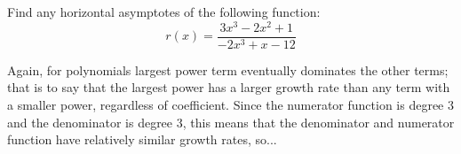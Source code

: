 \documentclass{ximera}
\begin{document}
\begin{example}
    Find any horizontal asymptotes of the following function:
    \[
        r(x) = \frac{3x^3 - 2x^2 + 1}{-2x^3 + x - 12}
    \]
    
    Again, for polynomials largest power term eventually dominates the other terms; that is to say that the largest power has a larger growth rate than any term with a smaller power, regardless of coefficient. Since the numerator function is degree 3 and the denominator is degree 3, this means that the denominator and numerator function have relatively similar growth rates, so...
    \begin{multipleChoice}
    \end{multipleChoice}
\end{example}
\end{document}
